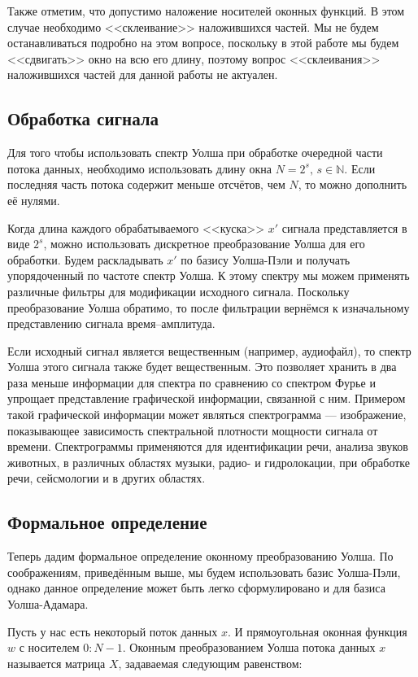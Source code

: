 \documentclass{matmex-diploma-custom}
\begin{document}
Также отметим, что допустимо наложение носителей оконных функций. В этом случае
 необходимо <<склеивание>> наложившихся частей. 
 Мы не будем останавливаться подробно на этом вопросе, поскольку 
в этой работе мы будем <<сдвигать>> окно на всю его длину, поэтому вопрос <<склеивания>> 
наложившихся частей для данной работы не актуален.


\subsection{Обработка сигнала}
Для того чтобы использовать спектр Уолша при обработке очередной части потока данных,
необходимо использовать длину окна $N = 2^s, \, s \in \mathbb{N}$. Если последняя
часть потока содержит меньше отсчётов, чем $N$, то можно дополнить её нулями.

Когда длина каждого обрабатываемого <<куска>> $x'$ сигнала представляется в виде
$2^s$, можно использовать дискретное преобразование Уолша для его обработки.
Будем раскладывать $x'$ по базису Уолша-Пэли и получать упорядоченный по частоте
спектр Уолша. К этому спектру мы можем применять различные фильтры для модификации
исходного сигнала. Поскольку преобразование Уолша обратимо, то 
после фильтрации вернёмся к изначальному представлению
сигнала время--амплитуда.

Если исходный сигнал является вещественным (например, аудиофайл), 
то спектр Уолша этого сигнала также будет вещественным. Это позволяет хранить 
в два раза меньше
информации для спектра
по сравнению со спектром Фурье
и упрощает представление графической информации, связанной 
с ним. Примером такой графической информации может являться спектрограмма ---
изображение, показывающее зависимость спектральной плотности мощности сигнала 
от времени. Спектрограммы применяются для идентификации речи, анализа звуков 
животных, в различных областях музыки, радио- и гидролокации, при обработке речи, 
сейсмологии и в других областях.




\subsection{Формальное определение}
Теперь дадим формальное определение оконному преобразованию Уолша. 
По соображениям, приведённым выше, мы будем использовать базис Уолша-Пэли,
однако данное определение может быть легко сформулировано и для базиса 
Уолша-Адамара.

Пусть у нас есть
некоторый поток данных $x$. И прямоугольная оконная функция $w$ с носителем
$0:N-1$.
Оконным преобразованием Уолша потока данных $x$ называется матрица $X$, задаваемая 
следующим равенством:
\end{document}
